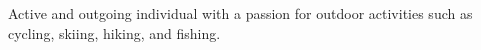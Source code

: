 

\large
\begin{center}
	\begin{minipage}{\textwidth}
		\begin{justify}
			{	
			Active and outgoing individual with a passion for outdoor activities such as cycling, skiing, hiking, and fishing.

			}	
		\end{justify}
	\end{minipage}%
\end{center}
